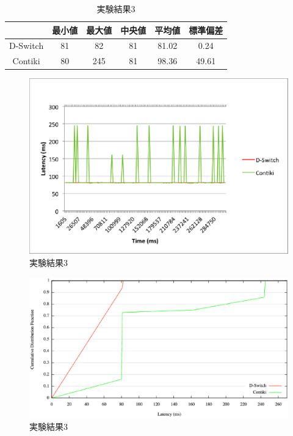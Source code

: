 \begin{table}[htb]
  \centering
  \caption{実験結果3}
  \begin{tabular}{|c||c|c|c|c|c|} \hline
    \backslashbox{}{} & 最小値 & 最大値 & 中央値 & 平均値 & 標準偏差 \\ \hline \hline
    D-Switch & 81 & 82 & 81 & 81.02 & 0.24 \\ \hline
    Contiki & 80 & 245 & 81 & 98.36 & 49.61 \\ \hline
  \end{tabular}
  \label{tab:latency3}
\end{table}

\begin{figure}[htbp]
 \begin{center}
  \includegraphics[width=120mm]{./images/latency3.eps}
 \end{center}
 \caption{実験結果3}
 \label{fig:latency3}
\end{figure}

\begin{figure}[htbp]
 \begin{center}
  \includegraphics[width=120mm]{./images/cdf3.eps}
 \end{center}
 \caption{実験結果3}
 \label{fig:cdf3}
\end{figure}





